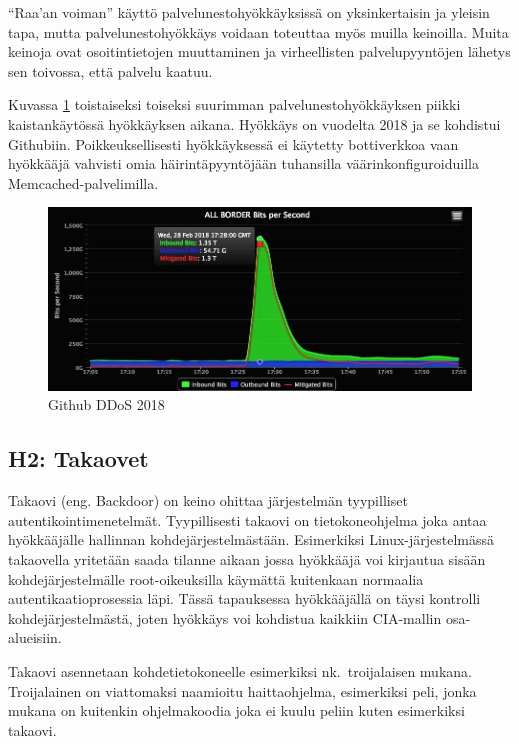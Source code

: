 ``Raa'an voiman'' käyttö palvelunestohyökkäyksissä on yksinkertaisin ja yleisin tapa, mutta palvelunestohyökkäys voidaan toteuttaa myös muilla keinoilla. Muita keinoja ovat osoitintietojen muuttaminen ja virheellisten palvelupyyntöjen lähetys sen toivossa, että palvelu kaatuu.

Kuvassa \ref{github_ddos} toistaiseksi toiseksi suurimman palvelunestohyökkäyksen piikki kaistankäytössä hyökkäyksen aikana. Hyökkäys on vuodelta 2018 ja se kohdistui Githubiin. Poikkeuksellisesti hyökkäyksessä ei käytetty bottiverkkoa vaan hyökkääjä vahvisti omia häirintäpyyntöjään tuhansilla väärinkonfiguroiduilla Memcached-palvelimilla.~\cite{wired_github_ddos}

\begin{figure}
\centering \includegraphics[width=1\textwidth]{kuvat/github_ddos.jpg}
\caption{Github DDoS 2018}
\label{github_ddos} 
\end{figure}

\subsection{H2: Takaovet}
Takaovi (eng. Backdoor) on keino ohittaa järjestelmän tyypilliset autentikointimenetelmät. Tyypillisesti takaovi on tietokoneohjelma joka antaa hyökkääjälle hallinnan kohdejärjestelmästään. Esimerkiksi Linux-järjestelmässä takaovella yritetään saada tilanne aikaan jossa hyökkääjä voi kirjautua sisään kohdejärjestelmälle root-oikeuksilla käymättä kuitenkaan normaalia autentikaatioprosessia läpi. Tässä tapauksessa hyökkääjällä on täysi kontrolli kohdejärjestelmästä, joten hyökkäys voi kohdistua kaikkiin CIA-mallin osa-alueisiin.~\cite{wired_backdoor}

Takaovi asennetaan kohdetietokoneelle esimerkiksi nk.\ troijalaisen mukana. Troijalainen on viattomaksi naamioitu haittaohjelma, esimerkiksi peli, jonka mukana on kuitenkin ohjelmakoodia joka ei kuulu peliin kuten esimerkiksi takaovi.

